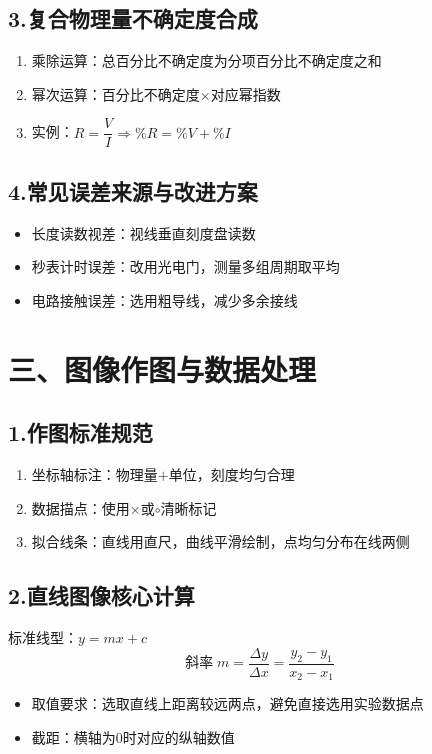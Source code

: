 \documentclass[a4paper,11pt]{article}
\begin{document}
\subsection{3.复合物理量不确定度合成}
\begin{enumerate}
    \item 乘除运算：总百分比不确定度为分项百分比不确定度之和
    \item 幂次运算：百分比不确定度$\times$对应幂指数
    \item 实例：$R=\dfrac{V}{I}\Rightarrow \%R=\%V+\%I$
\end{enumerate}

\subsection{4.常见误差来源与改进方案}
\begin{itemize}
    \item 长度读数视差：视线垂直刻度盘读数
    \item 秒表计时误差：改用光电门，测量多组周期取平均
    \item 电路接触误差：选用粗导线，减少多余接线
\end{itemize}

\section{三、图像作图与数据处理}
\subsection{1.作图标准规范}
\begin{enumerate}
    \item 坐标轴标注：物理量$+$单位，刻度均匀合理
    \item 数据描点：使用$\times$或$\circ$清晰标记
    \item 拟合线条：直线用直尺，曲线平滑绘制，点均匀分布在线两侧
\end{enumerate}

\subsection{2.直线图像核心计算}
标准线型：$y=mx+c$
\[
\text{斜率} \; m=\frac{\Delta y}{\Delta x}=\frac{y_2-y_1}{x_2-x_1}
\]
\begin{itemize}
    \item 取值要求：选取直线上距离较远两点，避免直接选用实验数据点
    \item 截距：横轴为0时对应的纵轴数值
\end{itemize}
\end{document}
